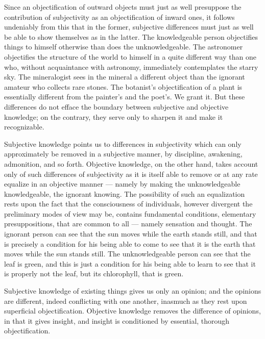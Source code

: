 \documentclass[12pt]{book}
\begin{document}
Since an objectification of outward objects must just as well presuppose the
contribution of subjectivity as an objectification of inward ones, it follows
undeniably from this that in the former, subjective differences must just as
well be able to show themselves as in the latter. The knowledgeable person
objectifies things to himself otherwise than does the unknowledgeable. The
astronomer objectifies the structure of the world to himself in a quite
different way than one who, without acquaintance with astronomy, immediately
contemplates the starry sky. The mineralogist sees in the mineral a different
object than the ignorant amateur who collects rare stones. The botanist's
objectification of a plant is essentially different from the painter's and the
poet's. We grant it. But these differences do not efface the boundary between
subjective and objective knowledge; on the contrary, they serve only to sharpen
it and make it recognizable.

Subjective knowledge points us to differences in subjectivity which can only
approximately be removed in a subjective manner, by discipline, awakening,
admonition, and so forth. Objective knowledge, on the other hand, takes account
only of such differences of subjectivity as it is itself able to remove or at
any rate equalize in an objective manner --- namely by making the
unknowledgeable knowledgeable, the ignorant knowing. The possibility of such an
equalization rests upon the fact that the consciousness of individuals, however
divergent the preliminary modes of view may be, contains fundamental
conditions, elementary presuppositions, that are common to all --- namely
sensation and thought. The ignorant person can see that the sun moves while the
earth stands still, and that is precisely a condition for his being able to come
to see that it is the earth that moves while the sun stands still. The
unknowledgeable person can see that the leaf is green, and this is just a
condition for his being able to learn to see that it is properly not the leaf,
but its chlorophyll, that is green.

Subjective knowledge of existing things gives us only an opinion; and the
opinions are different, indeed conflicting with one another, inasmuch as they
rest upon superficial objectification. Objective knowledge removes the
difference of opinions, in that it gives insight, and insight is conditioned by
essential, thorough objectification.
\end{document}
